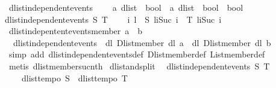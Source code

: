 \begin{isabellebody}
%
\endisadelimproof
\isanewline
\isanewline
{}\isamarkupfalse%
\ dlist{\isacharunderscore}independent{\isacharunderscore}events\ {\isacharcolon}{\isacharcolon}\ \isanewline
\ \ {\isachardoublequoteopen}{\isacharparenleft}{\isacharprime}a\ dlist\ {\isasymRightarrow}\ bool{\isacharparenright}\ {\isasymRightarrow}\ {\isacharparenleft}{\isacharprime}a\ dlist\ {\isasymRightarrow}\ bool{\isacharparenright}\ {\isasymRightarrow}\ bool{\isachardoublequoteclose}\isanewline
{}\isanewline
{\isachardoublequoteopen}dlist{\isacharunderscore}independent{\isacharunderscore}events\ S\ T\ {\isasymequiv}\ \isanewline
\ \ {\isacharparenleft}{\isasymforall}i\ l{\isachardot}\ {\isasymnot}\ {\isacharparenleft}S\ {\isacharparenleft}l{\isasymdagger}i{\isachardot}{\isachardot}{\isacharparenleft}Suc\ i{\isacharparenright}{\isacharparenright}\ {\isasymand}\ T\ {\isacharparenleft}l{\isasymdagger}i{\isachardot}{\isachardot}{\isacharparenleft}Suc\ i{\isacharparenright}{\isacharparenright}{\isacharparenright}{\isacharparenright}{\isachardoublequoteclose}\isanewline
\isanewline
{}\isamarkupfalse%
\ dlist{\isacharunderscore}indepentent{\isacharunderscore}events{\isacharunderscore}member{\isacharcolon}\ {\isachardoublequoteopen}a\ {\isasymnoteq}\ b\ {\isasymLongrightarrow}\ \isanewline
\ \ dlist{\isacharunderscore}independent{\isacharunderscore}events\ {\isacharparenleft}{\isasymlambda}\ dl{\isachardot}\ Dlist{\isachardot}member\ dl\ a{\isacharparenright}\ {\isacharparenleft}{\isasymlambda}\ dl{\isachardot}\ Dlist{\isachardot}member\ dl\ b{\isacharparenright}{\isachardoublequoteclose}\isanewline
%
\isadelimproof
%
\endisadelimproof
%
\isatagproof
{}\isamarkupfalse%
\ {\isacharparenleft}simp\ add{\isacharcolon}\ dlist{\isacharunderscore}independent{\isacharunderscore}events{\isacharunderscore}def\ Dlist{\isachardot}member{\isacharunderscore}def\ List{\isachardot}member{\isacharunderscore}def{\isacharparenright}\isanewline
{}\isamarkupfalse%
\ {\isacharparenleft}metis\ dlist{\isacharunderscore}member{\isacharunderscore}suc{\isacharunderscore}nth{}{\isacharparenright}%
\endisatagproof
{\isafoldproof}%
%
\isadelimproof
\isanewline
%
\endisadelimproof
\isanewline
\isanewline
\isanewline
\isanewline
\isanewline
\isanewline
{}\isamarkupfalse%
\ dlist{\isacharunderscore}and{\isacharunderscore}split{}{\isacharcolon}\isanewline
\ \ {\isachardoublequoteopen}dlist{\isacharunderscore}independent{\isacharunderscore}events\ S\ T\ {\isasymLongrightarrow}\ \isanewline
\ \ \ \ dlist{\isacharunderscore}tempo{}\ S\ {\isasymLongrightarrow}\ dlist{\isacharunderscore}tempo{}\ T\ {\isasymLongrightarrow}\isanewline

\end{isabellebody}
